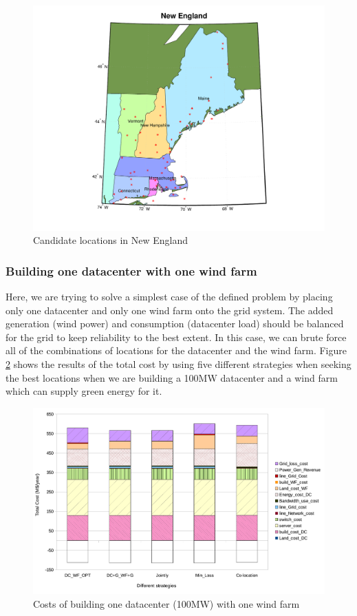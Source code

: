 \begin{figure}[ht]
\centering
\includegraphics[width=1\columnwidth]{img/NE_map}
\caption{Candidate locations in New England}
\label{fig:NE_locs}
\end{figure}

\subsubsection{Building one datacenter with one wind farm}

Here, we are trying to solve a simplest case of the defined problem by placing only one datacenter and only one wind farm onto the grid system. The added generation (wind power) and consumption (datacenter load) should be balanced for the grid to keep reliability to the best extent. In this case, we can brute force all of the combinations of locations for the datacenter and the wind farm. Figure \ref{fig:cost1dc1wf} shows the results of the total cost by using five different strategies when seeking the best locations when we are building a 100MW datacenter and a wind farm which can supply green energy for it.

\begin{figure}[ht]
\centering
\includegraphics[width=1\columnwidth]{img/cost-one-dc-one-wf}
\caption{Costs of building one datacenter (100MW) with one wind farm}
\label{fig:cost1dc1wf}
\end{figure}

